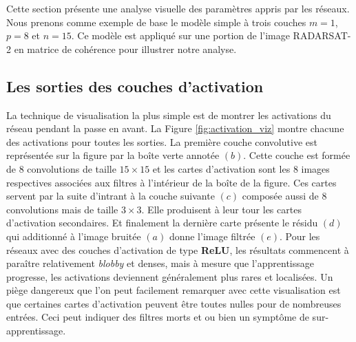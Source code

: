 Cette section présente une analyse visuelle des paramètres appris par les réseaux. Nous prenons comme exemple de base le modèle simple à trois couches $m=1$, $p=8$ et $n=15$. Ce modèle est appliqué sur une portion de l'image RADARSAT-2 en matrice de cohérence pour illustrer notre analyse.  

\subsection{Les sorties des couches d'activation}

La technique de visualisation la plus simple est de montrer les activations du réseau pendant la passe en avant. La Figure \ref{fig:activation_viz} montre chacune des activations pour toutes les sorties. La première couche convolutive est représentée sur la figure par la boîte verte annotée $(b)$. Cette couche est formée de 8 convolutions de taille $15\times15$ et les cartes d'activation sont les 8 images respectives associées aux filtres à l'intérieur de la boîte de la figure.  Ces cartes servent par la suite d'intrant à la couche suivante $(c)$ composée aussi de 8 convolutions mais de taille $3\times3$. Elle produisent à leur tour les cartes d'activation secondaires. Et finalement la dernière carte présente le résidu $(d)$ qui  additionné à l'image bruitée $(a)$ donne l'image filtrée $(e)$.
Pour les réseaux avec des couches d'activation de type \textbf{ReLU}, les résultats commencent à paraître relativement \textit{blobby} et denses, mais à mesure que l'apprentissage progresse, les activations deviennent généralement plus rares et localisées. Un piège dangereux que l'on peut facilement remarquer avec cette visualisation est que certaines cartes d'activation peuvent être toutes nulles pour de nombreuses entrées. Ceci peut indiquer des filtres morts et ou bien un symptôme de sur-apprentissage.

